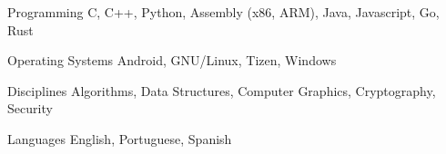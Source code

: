 

\begin{cvskills}

  \cvskill
    {Programming} %
    {C, C++, Python, Assembly (x86, ARM), Java, Javascript, Go, Rust} %

  \cvskill
    {Operating Systems} %
    {Android, GNU/Linux, Tizen, Windows} %

  \cvskill
    {Disciplines} %
    {Algorithms, Data Structures, Computer Graphics, Cryptography, Security} %

  \cvskill
    {Languages} %
    {English, Portuguese, Spanish} %

\end{cvskills}
